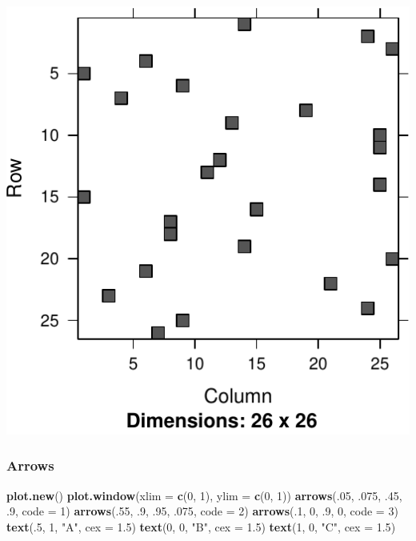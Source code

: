 \documentclass[]{book}
\newenvironment{Shaded}{\begin{snugshade}}{\end{snugshade}}
\newcommand{\DataTypeTok}[1]{\textcolor[rgb]{0.13,0.29,0.53}{#1}}
\newcommand{\DecValTok}[1]{\textcolor[rgb]{0.00,0.00,0.81}{#1}}
\newcommand{\FloatTok}[1]{\textcolor[rgb]{0.00,0.00,0.81}{#1}}
\newcommand{\KeywordTok}[1]{\textcolor[rgb]{0.13,0.29,0.53}{\textbf{#1}}}
\newcommand{\NormalTok}[1]{#1}
\newcommand{\StringTok}[1]{\textcolor[rgb]{0.31,0.60,0.02}{#1}}
\theoremstyle{definition}
\theoremstyle{definition}
\theoremstyle{definition}
\theoremstyle{remark}
\begin{document}
\includegraphics[width=0.5\linewidth]{Rcourse_files/figure-latex/unnamed-chunk-261-1}

\hypertarget{arrows}{%
\subsubsection{Arrows}\label{arrows}}

\begin{Shaded}
\begin{Highlighting}[]
\KeywordTok{plot.new}\NormalTok{()}
\KeywordTok{plot.window}\NormalTok{(}\DataTypeTok{xlim =} \KeywordTok{c}\NormalTok{(}\DecValTok{0}\NormalTok{, }\DecValTok{1}\NormalTok{), }\DataTypeTok{ylim =} \KeywordTok{c}\NormalTok{(}\DecValTok{0}\NormalTok{, }\DecValTok{1}\NormalTok{))}
\KeywordTok{arrows}\NormalTok{(.}\DecValTok{05}\NormalTok{, }\FloatTok{.075}\NormalTok{, }\FloatTok{.45}\NormalTok{, }\FloatTok{.9}\NormalTok{, }\DataTypeTok{code =} \DecValTok{1}\NormalTok{)}
\KeywordTok{arrows}\NormalTok{(.}\DecValTok{55}\NormalTok{, }\FloatTok{.9}\NormalTok{, }\FloatTok{.95}\NormalTok{, }\FloatTok{.075}\NormalTok{, }\DataTypeTok{code =} \DecValTok{2}\NormalTok{)}
\KeywordTok{arrows}\NormalTok{(.}\DecValTok{1}\NormalTok{, }\DecValTok{0}\NormalTok{, }\FloatTok{.9}\NormalTok{, }\DecValTok{0}\NormalTok{, }\DataTypeTok{code =} \DecValTok{3}\NormalTok{)}
\KeywordTok{text}\NormalTok{(.}\DecValTok{5}\NormalTok{, }\DecValTok{1}\NormalTok{, }\StringTok{"A"}\NormalTok{, }\DataTypeTok{cex =} \FloatTok{1.5}\NormalTok{)}
\KeywordTok{text}\NormalTok{(}\DecValTok{0}\NormalTok{, }\DecValTok{0}\NormalTok{, }\StringTok{"B"}\NormalTok{, }\DataTypeTok{cex =} \FloatTok{1.5}\NormalTok{)}
\KeywordTok{text}\NormalTok{(}\DecValTok{1}\NormalTok{, }\DecValTok{0}\NormalTok{, }\StringTok{"C"}\NormalTok{, }\DataTypeTok{cex =} \FloatTok{1.5}\NormalTok{)}
\end{Highlighting}
\end{Shaded}
\end{document}
